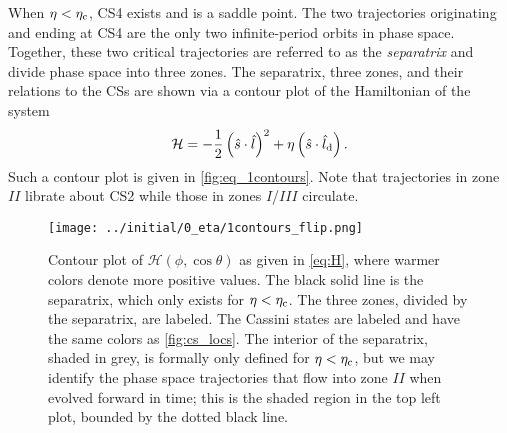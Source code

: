 \documentclass[
        fleqn,
        usenatbib,
        referee,
    ]{mnras}
\newcommand*{\p}[1]{\left(#1\right)}
\begin{document}
When $\eta < \eta_{\rm c}$, CS4 exists and is a saddle point. The two trajectories
originating and ending at CS4 are the only two infinite-period orbits in phase
space. Together, these two critical trajectories are referred to as the
\emph{separatrix} and divide phase space into three zones. The separatrix, three
zones, and their relations to the CSs are shown via a contour plot of the
Hamiltonian of the system
\begin{equation}
    \mathcal{H} = -\frac{1}{2}\p{\hat{s} \cdot \hat{l}}^2
            + \eta \p{\hat{s} \cdot \hat{l}_{\rm d}}.\label{eq:H}
\end{equation}
Such a contour plot is given in \autoref{fig:eq_1contours}. Note that
trajectories in zone $II$ librate about CS2 while those in zones $I$/$III$
circulate.
\begin{figure*}
    \centering
    \texttt{[image: ../initial/0\_eta/1contours\_flip.png]}
    \caption{Contour plot of $\mathcal{H}\p{\phi, \cos \theta}$ as given in
    \autoref{eq:H}, where warmer colors denote more positive values. The black
    solid line is the separatrix, which only exists for $\eta < \eta_{\rm c}$. The
    three zones, divided by the separatrix, are labeled. The Cassini states are
    labeled and have the same colors as \autoref{fig:cs_locs}. The interior of
    the separatrix, shaded in grey, is formally only defined for $\eta <
    \eta_{\rm c}$, but we may identify the phase space trajectories that flow into
    zone $II$ when evolved forward in time; this is the shaded region in the top
    left plot, bounded by the dotted black line.}\label{fig:eq_1contours}
\end{figure*}
\end{document}

